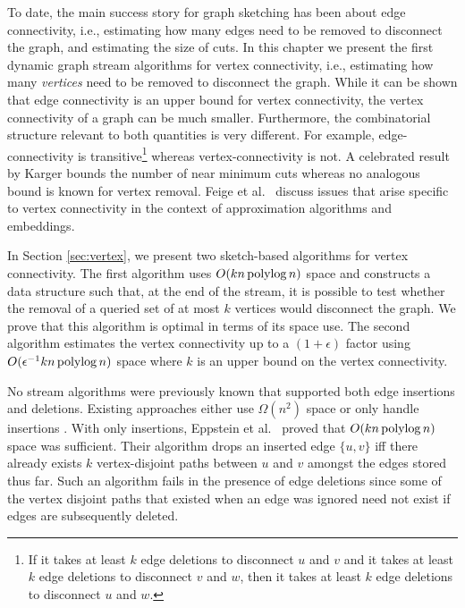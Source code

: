  To date, the main success story for graph sketching has been  about edge connectivity, i.e., estimating how many edges need to be removed to disconnect the graph, and estimating the size of cuts. In this chapter we present the first dynamic graph stream algorithms for vertex connectivity, i.e., estimating how many \emph{vertices} need to be removed to disconnect the graph. While it can be shown that edge connectivity is an upper bound for vertex connectivity, the vertex connectivity of a graph can be much smaller. Furthermore, the combinatorial structure relevant to both quantities is very different. For example, edge-connectivity is transitive\footnote{If it takes at least $ k$ edge deletions to disconnect $u$ and $v$ and it takes at least $ k$ edge deletions to disconnect $v$ and $w$, then it takes at least $ k$ edge deletions to disconnect $u$ and $w$.} whereas vertex-connectivity is not. A celebrated result by Karger \cite{karger1994} bounds the number of near minimum cuts whereas no analogous bound is known for vertex removal.  Feige et al.~\cite{FeigeHL05} discuss issues that arise specific to vertex connectivity in the context of approximation algorithms and embeddings.


In Section \ref{sec:vertex}, we present two sketch-based algorithms for vertex connectivity. The first algorithm uses $O(kn\operatorname{polylog} n)$ space and constructs a data structure such that, at the end of the stream, it is possible to test whether the removal of a queried set of at most $k$ vertices would disconnect the graph. We  prove that this algorithm is optimal in terms of its space use. The second algorithm estimates the vertex connectivity up to a  $(1+\epsilon)$ factor using $O(\epsilon^{-1} kn\operatorname{polylog} n)$ space where $k$ is an upper bound on the vertex connectivity. 

No stream algorithms were previously known that supported both edge insertions and deletions. Existing approaches either use $\Omega(n^2)$ space \cite{Sankowski07} or only handle insertions \cite{EppsteinGIN97}. With only insertions, Eppstein et al.~\cite{EppsteinGIN97} proved that $O(kn \operatorname{polylog} n)$ space was sufficient. Their algorithm drops an inserted edge $\{u,v\}$ iff there already exists $k$ vertex-disjoint paths between $u$ and $v$ amongst the edges stored thus far. Such an algorithm fails in the presence of edge deletions since some of the vertex disjoint paths that existed when an edge was ignored need not exist if edges are subsequently deleted.

